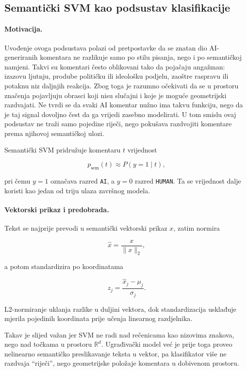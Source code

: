 \subsection{Semantički SVM kao podsustav klasifikacije}

\paragraph{Motivacija.}
Uvođenje ovoga podsustava polazi od pretpostavke da se znatan dio AI-generiranih komentara ne razlikuje samo po stilu pisanja, nego i po semantičkoj namjeni. Takvi su komentari često oblikovani tako da pojačaju angažman: izazovu ljutnju, prodube političku ili ideološku podjelu, zaoštre raspravu ili potaknu niz daljnjih reakcija. Zbog toga je razumno očekivati da se u prostoru značenja pojavljuju obrasci koji nisu slučajni i koje je moguće geometrijski razdvajati. Ne tvrdi se da svaki AI komentar nužno ima takvu funkciju, nego da je taj signal dovoljno čest da ga vrijedi zasebno modelirati. U tom smislu ovaj podsustav ne traži samo pojedine riječi, nego pokušava razdvojiti komentare prema njihovoj semantičkoj ulozi.

Semantički SVM pridružuje komentaru $t$ vrijednost

\[
p_{\mathrm{sem}}(t) \approx P(y=1\mid t),
\]

pri čemu $y=1$ označava razred \texttt{AI}, a $y=0$ razred \texttt{HUMAN}. Ta se vrijednost dalje koristi kao jedan od triju ulaza završnog modela.

\paragraph{Vektorski prikaz i predobrada.}
Tekst se najprije prevodi u semantički vektorski prikaz $x$, zatim normira

\[
\hat{x}=\frac{x}{\|x\|_2},
\]

a potom standardizira po koordinatama

\[
z_j=\frac{\hat{x}_j-\mu_j}{\sigma_j}.
\]

L2-normiranje uklanja razlike u duljini vektora, dok standardizacija usklađuje mjerila pojedinih koordinata prije učenja linearnog razdjelnika.

Takav je slijed važan jer SVM ne radi nad rečenicama kao nizovima znakova, nego nad točkama u prostoru $\mathbb{R}^d$. Ugrađivački model već je prije toga proveo nelinearno semantičko preslikavanje teksta u vektor, pa klasifikator više ne razdvaja ``riječi'', nego geometrijske položaje komentara u dobivenom prostoru.

